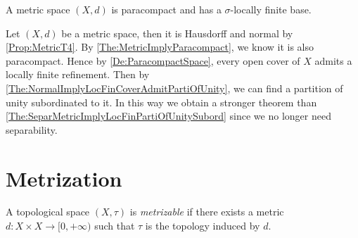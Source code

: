 \documentclass[screen,single]{techreport}
\numberwithin{equation}{section}
\begin{document}
\begin{theorem}\label{The:MetricImplyParacompact}
  A metric space $(X,d)$ is paracompact and has a $\sigma$-locally finite base.
\end{theorem}

\begin{remark}\label{Rem:StrongerThmByParacompact}
  Let $(X,d)$ be a metric space, then it is Hausdorff and normal by \cref{Prop:MetricT4}.
  By \cref{The:MetricImplyParacompact}, we know it is also paracompact.
  Hence by \cref{De:ParacompactSpace}, every open cover of $X$ admits a locally finite refinement.
  Then by \cref{The:NormalImplyLocFinCoverAdmitPartiOfUnity}, we can find a partition of unity subordinated to it.
  In this way we obtain a stronger theorem than \cref{The:SeparMetricImplyLocFinPartiOfUnitySubord} since we no longer need separability.
\end{remark}

\section{Metrization}

\begin{definition}\label{De:Metrizable}
  A topological space $(X,\tau)$ is \emph{metrizable} if there exists a metric $d : X \times X \to [0,+\infty)$ such that $\tau$ is the topology induced by $d$.
\end{definition}
\end{document}
